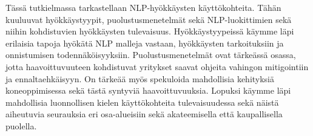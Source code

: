 Tässä tutkielmassa tarkastellaan NLP-hyökkäysten käyttökohteita. Tähän kuuluuvat hyökkäystyypit, puolustusmenetelmät sekä NLP-luokittimien sekä niihin kohdistuvien hyökkäysten tulevaisuus. Hyökkäystyypeissä käymme läpi erilaisia tapoja hyökätä NLP\- malleja vastaan, hyökkäysten tarkoituksiin ja onnistumisen todennäköisyyksiin. Puolustusmenetelmät ovat tärkeässä osassa, jotta haavoittuvuuteen kohdistuvat yritykset saavat ohjeita vahingon mitigointiin ja ennaltaehkäisyyn. On tärkeää myös spekuloida mahdollisia kehityksiä koneoppimisessa sekä tästä syntyviä haavoittuvuuksia. Lopuksi käymme läpi mahdollisia luonnollisen kielen käyttökohteita tulevaisuudessa sekä näistä aiheutuvia seurauksia eri osa-alueisiin sekä akateemisella että kaupallisella puolella.